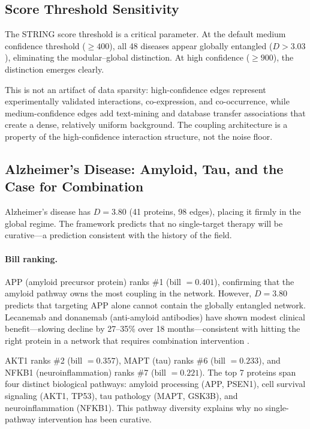\documentclass[11pt,a4paper]{article}
\begin{document}
\subsection{Score Threshold Sensitivity}

The STRING score threshold is a critical parameter. At the default medium confidence threshold ($\geq 400$), all 48 diseases appear globally entangled ($D > 3.03$), eliminating the modular--global distinction. At high confidence ($\geq 900$), the distinction emerges clearly.

This is not an artifact of data sparsity: high-confidence edges represent experimentally validated interactions, co-expression, and co-occurrence, while medium-confidence edges add text-mining and database transfer associations that create a dense, relatively uniform background. The coupling architecture is a property of the high-confidence interaction structure, not the noise floor.

\subsection{Alzheimer's Disease: Amyloid, Tau, and the Case for Combination}
\label{sec:alzheimers}

Alzheimer's disease has $D = 3.80$ (41 proteins, 98 edges), placing it firmly in the global regime. The framework predicts that no single-target therapy will be curative---a prediction consistent with the history of the field.

\paragraph{Bill ranking.} APP (amyloid precursor protein) ranks \#1 (bill $= 0.401$), confirming that the amyloid pathway owns the most coupling in the network. However, $D = 3.80$ predicts that targeting APP alone cannot contain the globally entangled network. Lecanemab and donanemab (anti-amyloid antibodies) have shown modest clinical benefit---slowing decline by 27--35\% over 18 months---consistent with hitting the right protein in a network that requires combination intervention \citep{vandyck2023,sims2023}.

AKT1 ranks \#2 (bill $= 0.357$), MAPT (tau) ranks \#6 (bill $= 0.233$), and NFKB1 (neuroinflammation) ranks \#7 (bill $= 0.221$). The top 7 proteins span four distinct biological pathways: amyloid processing (APP, PSEN1), cell survival signaling (AKT1, TP53), tau pathology (MAPT, GSK3B), and neuroinflammation (NFKB1). This pathway diversity explains why no single-pathway intervention has been curative.
\end{document}
